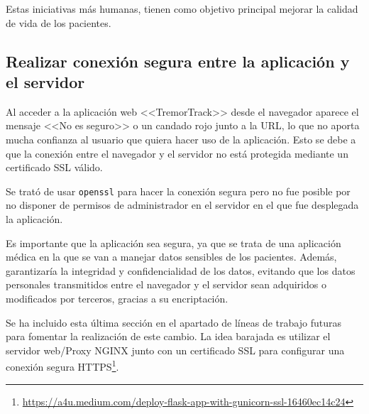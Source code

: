 Estas iniciativas más humanas, tienen como objetivo principal mejorar la calidad de vida de los pacientes.



\subsection{Realizar conexión segura entre la aplicación y el servidor}
Al acceder a la aplicación web <<TremorTrack>> desde el navegador aparece el mensaje <<No es seguro>> o un candado rojo junto a la URL, lo que no aporta mucha confianza al usuario que quiera hacer uso de la aplicación. 
Esto se debe a que la conexión entre el navegador y el servidor no está protegida mediante un certificado SSL válido.

Se trató de usar \texttt{openssl} para hacer la conexión segura pero no fue posible por no disponer de permisos de administrador en el servidor en el que fue desplegada la aplicación.

Es importante que la aplicación sea segura, ya que se trata de una aplicación médica en la que se van a manejar datos sensibles de los pacientes. Además, garantizaría la integridad y confidencialidad de los datos, evitando que los datos personales transmitidos entre el navegador y el servidor sean adquiridos o modificados por terceros, gracias a su encriptación.

Se ha incluido esta última sección en el apartado de líneas de trabajo futuras para fomentar la realización de este cambio.
La idea barajada es utilizar el servidor web/Proxy NGINX junto con un certificado SSL para configurar una conexión segura HTTPS\footnote{\url{https://a4u.medium.com/deploy-flask-app-with-gunicorn-ssl-16460ec14c24}}.
